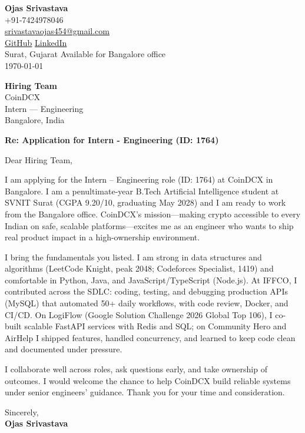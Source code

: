 \documentclass[a4paper,11pt]{article}
\begin{document}
\begin{flushright}
\textbf{Ojas Srivastava} \\
+91-7424978046 \\
\href{mailto:srivastavaojas454@gmail.com}{srivastavaojas454@gmail.com} \\
\href{https://github.com/Ojas-Srivastava05}{GitHub} \textbar{}
\href{https://linkedin.com/in/ojas-srivastava05}{LinkedIn} \\
Surat, Gujarat \textbar{} Available for Bangalore office \\
\today
\end{flushright}

\vspace{4mm}
\textbf{Hiring Team} \\
CoinDCX \\
Intern --- Engineering \\
Bangalore, India

\vspace{2mm}
\textbf{Re: Application for Intern - Engineering (ID: 1764)}

Dear Hiring Team,

I am applying for the Intern -- Engineering role (ID: 1764) at CoinDCX in Bangalore. I am a penultimate-year B.Tech Artificial Intelligence student at SVNIT Surat (CGPA 9.20/10, graduating May 2028) and I am ready to work from the Bangalore office. CoinDCX's mission---making crypto accessible to every Indian on safe, scalable platforms---excites me as an engineer who wants to ship real product impact in a high-ownership environment.

I bring the fundamentals you listed. I am strong in data structures and algorithms (LeetCode Knight, peak 2048; Codeforces Specialist, 1419) and comfortable in Python, Java, and JavaScript/TypeScript (Node.js). At IFFCO, I contributed across the SDLC: coding, testing, and debugging production APIs (MySQL) that automated 50+ daily workflows, with code review, Docker, and CI/CD. On LogiFlow (Google Solution Challenge 2026 Global Top 106), I co-built scalable FastAPI services with Redis and SQL; on Community Hero and AirHelp I shipped features, handled concurrency, and learned to keep code clean and documented under pressure.

I collaborate well across roles, ask questions early, and take ownership of outcomes. I would welcome the chance to help CoinDCX build reliable systems under senior engineers' guidance. Thank you for your time and consideration.

Sincerely, \\
\vspace{8mm}
\textbf{Ojas Srivastava}
\end{document}

